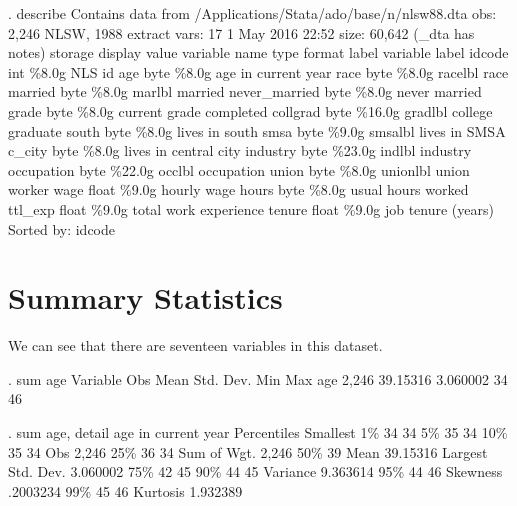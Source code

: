 \documentclass[]{article}
\begin{document}
\begin{stlog}
. describe
{\smallskip}
Contains data from /Applications/Stata/ado/base/n/nlsw88.dta
  obs:         2,246                          NLSW, 1988 extract
 vars:            17                          1 May 2016 22:52
 size:        60,642                          (_dta has notes)
              storage   display    value
variable name   type    format     label      variable label
idcode          int     \%8.0g                 NLS id
age             byte    \%8.0g                 age in current year
race            byte    \%8.0g      racelbl    race
married         byte    \%8.0g      marlbl     married
never_married   byte    \%8.0g                 never married
grade           byte    \%8.0g                 current grade completed
collgrad        byte    \%16.0g     gradlbl    college graduate
south           byte    \%8.0g                 lives in south
smsa            byte    \%9.0g      smsalbl    lives in SMSA
c_city          byte    \%8.0g                 lives in central city
industry        byte    \%23.0g     indlbl     industry
occupation      byte    \%22.0g     occlbl     occupation
union           byte    \%8.0g      unionlbl   union worker
wage            float   \%9.0g                 hourly wage
hours           byte    \%8.0g                 usual hours worked
ttl_exp         float   \%9.0g                 total work experience
tenure          float   \%9.0g                 job tenure (years)
Sorted by: idcode
{\smallskip}
\end{stlog}

\section{Summary Statistics}\label{summary-statistics}

We can see that there are seventeen variables in this dataset.

\begin{stlog}
. sum age
{\smallskip}
    Variable {\VBAR}        Obs        Mean    Std. Dev.       Min        Max
         age {\VBAR}      2,246    39.15316    3.060002         34         46
{\smallskip}
\end{stlog}

\begin{stlog}
. sum age, detail
{\smallskip}
                     age in current year
      Percentiles      Smallest
 1\%           34             34
 5\%           35             34
10\%           35             34       Obs               2,246
25\%           36             34       Sum of Wgt.       2,246
{\smallskip}
50\%           39                      Mean           39.15316
                        Largest       Std. Dev.      3.060002
75\%           42             45
90\%           44             45       Variance       9.363614
95\%           44             46       Skewness       .2003234
99\%           45             46       Kurtosis       1.932389
{\smallskip}
\end{stlog}
\end{document}
